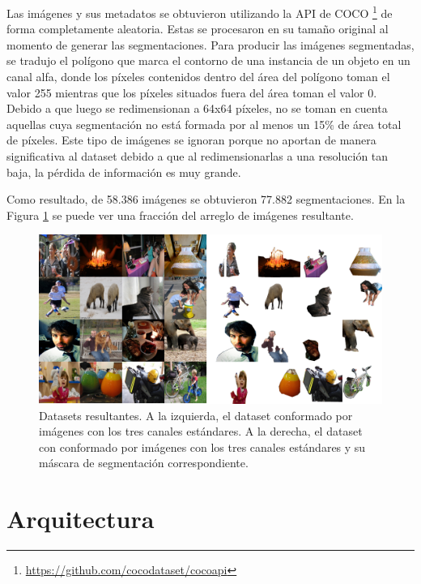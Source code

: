 \documentclass[spanish]{report}
\begin{document}
Las imágenes y sus metadatos se obtuvieron utilizando la API de COCO \footnote{\url{https://github.com/cocodataset/cocoapi}} de forma completamente aleatoria. Estas se procesaron en su tamaño original al momento de generar las segmentaciones. Para producir las imágenes segmentadas, se tradujo el polígono que marca el contorno de una instancia de un objeto en un canal alfa, donde los píxeles contenidos dentro del área del polígono toman el valor 255 mientras que los píxeles situados fuera del área toman el valor 0. Debido a que luego se redimensionan a 64x64 píxeles, no se toman en cuenta aquellas cuya segmentación no está formada por al menos un 15\% de área total de píxeles. Este tipo de imágenes se ignoran porque no aportan de manera significativa al dataset debido a que al redimensionarlas a una resolución tan baja, la pérdida de información es muy grande.

Como resultado, de 58.386 imágenes se obtuvieron 77.882 segmentaciones. En la Figura \ref{fig:comparacion_datasets_coco} se puede ver una fracción del arreglo de imágenes resultante.

\begin{figure}[H]
\centering
 \includegraphics[width=\linewidth]{comparacion_datasets_coco.png}
   \caption{Datasets resultantes. A la izquierda, el dataset conformado por imágenes con los tres canales estándares. A la derecha, el dataset con conformado por imágenes con los tres canales estándares y su máscara de segmentación correspondiente.}
  \label{fig:comparacion_datasets_coco}
\end{figure}

\section{Arquitectura}
\end{document}
